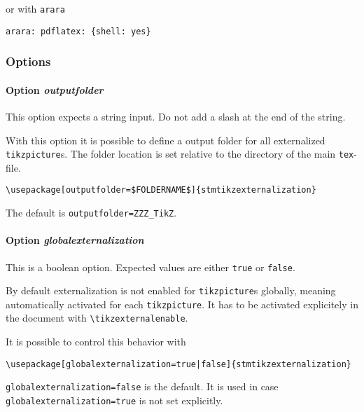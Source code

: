 \documentclass{scrartcl}
\begin{document}
or with \verb+arara+

\begin{verbatim}
arara: pdflatex: {shell: yes}
\end{verbatim}

\subsubsection{Options}
\label{sec:usage:preamble:externalization:options}

\paragraph{Option \protect\textit{outputfolder}}
\label{sec:usage:preamble:externalization:options:outputfolder}

This option expects a string input. Do not add a slash at the end of the string.

With this option it is possible to define a output folder for all externalized \texttt{tikzpicture}s. The folder location is set relative to the directory of the main \texttt{tex}-file.

\begin{verbatim}
\usepackage[outputfolder=$FOLDERNAME$]{stmtikzexternalization}
\end{verbatim}

The default is \texttt{outputfolder=ZZZ\_TikZ}.

\paragraph{Option \protect\textit{globalexternalization}}
\label{sec:usage:preamble:wholepackage:options:globalexternalization}

This is a boolean option.  Expected values are either \texttt{true} or \texttt{false}. 

By default externalization is not enabled for \texttt{tikzpicture}s globally, meaning automatically activated for each \texttt{tikzpicture}. It has to be activated explicitely in the document with \texttt{\textbackslash tikzexternalenable}.

It is possible to control this behavior with 

\begin{verbatim}
\usepackage[globalexternalization=true|false]{stmtikzexternalization}
\end{verbatim}

\texttt{globalexternalization=false} is the default. It is used in case \texttt{globalexternalization=true} is not set explicitly.
\end{document}

